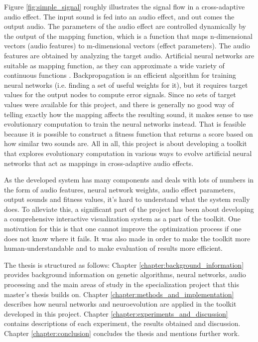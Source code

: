 Figure \ref{fig:simple_signal} roughly illustrates the signal flow in a cross-adaptive audio effect. The input sound is fed into an audio effect, and out comes the output audio. The parameters of the audio effect are controlled dynamically by the output of the mapping function, which is a function that maps n-dimensional vectors (audio features) to m-dimensional vectors (effect parameters). The audio features are obtained by analyzing the target audio. Artificial neural networks are suitable as mapping function, as they can approximate a wide variety of continuous functions \citep{hornik1991}. Backpropagation \citep{werbos1982, lecun1998} is an efficient algorithm for training neural networks (i.e. finding a set of useful weights for it), but it requires target values for the output nodes to compute error signals. Since no sets of target values were available for this project, and there is generally no good way of telling exactly how the mapping affects the resulting sound, it makes sense to use evolutionary computation to train the neural networks instead. That is feasible because it is possible to construct a fitness function that returns a score based on how similar two sounds are. All in all, this project is about developing a toolkit that explores evolutionary computation in various ways to evolve artificial neural networks that act as mappings in cross-adaptive audio effects.

As the developed system has many components and deals with lots of numbers in the form of audio features, neural network weights, audio effect parameters, output sounds and fitness values, it’s hard to understand what the system really does. To alleviate this, a significant part of the project has been about developing a comprehensive interactive visualization system as a part of the toolkit. One motivation for this is that one cannot improve the optimization process if one does not know where it fails. It was also made in order to make the toolkit more human-understandable and to make evaluation of results more efficient.

The thesis is structured as follows: Chapter \ref{chapter:background_information} provides background information on genetic algorithms, neural networks, audio processing and the main areas of study in the specialization project that this master's thesis builds on. Chapter \ref{chapter:methods_and_implementation} describes how neural networks and neuroevolution are applied in the toolkit developed in this project. Chapter \ref{chapter:experiments_and_discussion} contains descriptions of each experiment, the results obtained and discussion. Chapter \ref{chapter:conclusion} concludes the thesis and mentions further work.

